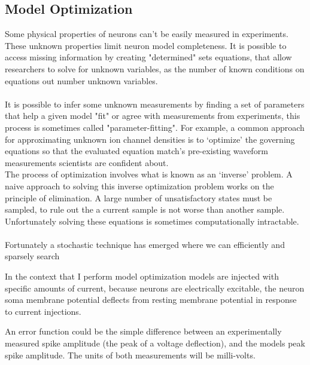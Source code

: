 \subsection{Model Optimization}
%
Some physical properties of neurons can’t be easily measured in experiments. These unknown properties limit neuron model completeness. It is possible to access missing information by creating "determined" sets equations, that allow researchers to solve for unknown variables, as the number of known conditions on equations out number unknown variables.\\
\\
It is possible to infer some unknown measurements by finding a set of parameters that help a given model "fit" or agree with measurements from experiments, this process is sometimes called "parameter-fitting". For example, a common approach for approximating unknown ion channel densities is to ‘optimize’ the governing equations so that the evaluated equation  match's pre-existing waveform measurements scientists are confident about. 
\\
The process of optimization involves what is known as an ‘inverse’ problem. A naive approach to solving this inverse optimization problem works on the principle of elimination. A large number of unsatisfactory states must be sampled, to rule out the a current sample is not worse than another sample. Unfortunately solving these equations is sometimes computationally intractable.\\


\\
Fortunately a stochastic technique has emerged where we can efficiently and sparsely search


In the context that I perform model optimization models are injected with specific amounts of current, because neurons are electrically excitable, the neuron soma membrane potential deflects from resting membrane potential in response to current injections.

An error function could be the simple difference between an experimentally measured spike amplitude (the peak of a voltage deflection), and the models peak spike amplitude. The units of both measurements will be milli-volts.  

